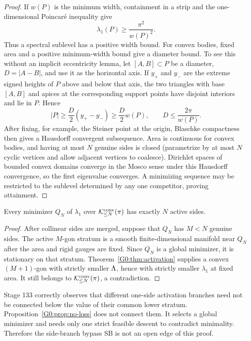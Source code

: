 \begin{proof}
If $w(P)$ is the minimum width, containment in a strip and the
one-dimensional Poincar\'e inequality give
\[
 \lambda_1(P)\ge\frac{\pi^2}{w(P)^2}.
\]
Thus a spectral sublevel has a positive width bound.  For convex bodies,
fixed area and a positive minimum-width bound give a diameter bound.  To
see this without an implicit eccentricity lemma, let $[A,B]\subset P$ be
a diameter, $D=|A-B|$, and use it as the horizontal axis.  If $y_+$ and
$y_-$ are the extreme signed heights of $P$ above and below that axis,
the two triangles with base $[A,B]$ and apices at the corresponding
support points have disjoint interiors and lie in $P$.  Hence
\[
 |P|\ge \frac D2(y_+-y_-)
      \ge \frac D2 w(P),
 \qquad
 D\le \frac{2\pi}{w(P)}.
\]
After fixing, for example, the Steiner point at the origin, Blaschke
compactness then gives a Hausdorff convergent
subsequence.  Area is continuous for convex bodies, and having at most
$N$ genuine sides is closed (parametrize by at most $N$ cyclic vertices
and allow adjacent vertices to coalesce).  Dirichlet spaces of bounded convex
domains converge in the Mosco sense under this Hausdorff convergence, so
the first eigenvalue converges.  A minimizing sequence may be restricted
to the sublevel determined by any one competitor, proving attainment.
\end{proof}

\begin{proposition}
\label{G0:prop:no-loss}
Every minimizer $Q_N$ of $\lambda_1$ over
$\mathcal K_{\le N}^{\rm conv}(\pi)$ has exactly $N$ active sides.
\end{proposition}

\begin{proof}
After collinear sides are merged, suppose that $Q_N$ has $M<N$ genuine
sides.  The active $M$-gon stratum is a smooth finite-dimensional
manifold near $Q_N$ after the area and rigid gauges are fixed.  Since
$Q_N$ is a global minimizer, it is stationary on that stratum.
Theorem~\ref{G0:thm:activation} supplies a convex $(M+1)$-gon with strictly
smaller $\Lambda$, hence with strictly smaller $\lambda_1$ at fixed
area.  It still belongs to $\mathcal K_{\le N}^{\rm conv}(\pi)$, a
contradiction.
\end{proof}

\begin{remark}
Stage 133 correctly observes that different one-side activation branches
need not be connected below the value of their common lower stratum.
Proposition~\ref{G0:prop:no-loss} does not connect them.  It selects a global
minimizer and needs only one strict feasible descent to contradict
minimality.  Therefore the side-branch bypass SB is not an open edge of
this proof.
\end{remark}

